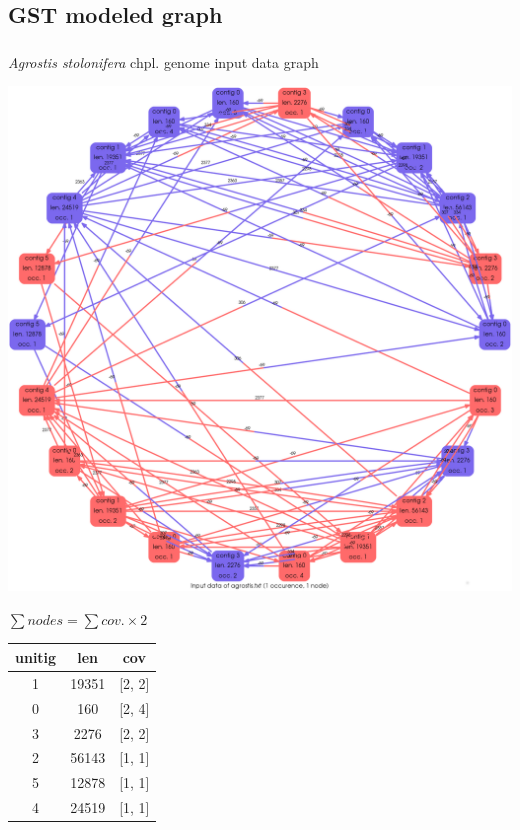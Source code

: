 \documentclass{beamer}
\begin{document}
\subsection{GST modeled graph}\label{6}
\begin{frame}
\frametitle{\textsc{}}
{\textit{Agrostis stolonifera} chpl. genome input data graph} \\
\begin{minipage}{0.73\textwidth}
\includegraphics[scale=0.13]{agrostis_INPT_graph_model.png}
\end{minipage}
%
\begin{minipage}{0.25\textwidth}
\tiny
$\sum nodes = \sum cov. \times 2$ \\
\vspace*{0.2cm}
\begin{tabular}{ | c | c | c |}
  \hline  
unitig & len & cov \\\hline         
1 & 19351 & [2, 2]\\
0 & 160   & [2, 4]\\
3 & 2276  & [2, 2]\\
2 & 56143 & [1, 1]\\
5 & 12878 & [1, 1]\\
4 & 24519 & [1, 1]\\
  \hline  
\end{tabular}
\end{minipage}

\end{frame}
\end{document}
